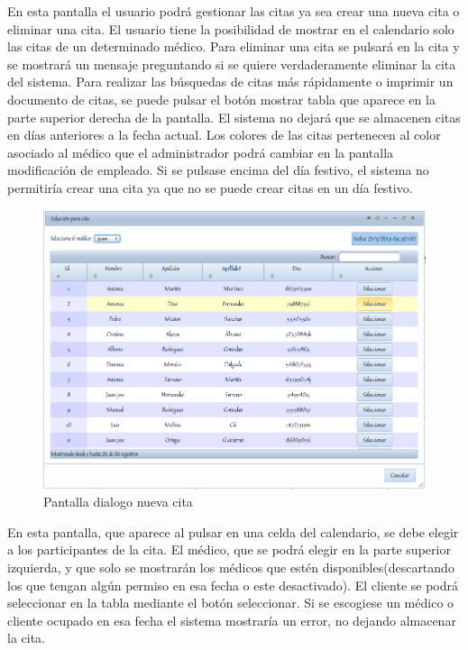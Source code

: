 \documentclass[a4paper,11pt]{book}
\begin{document}
En esta pantalla el usuario podrá gestionar las citas ya sea crear una nueva cita o eliminar una cita. El usuario tiene la posibilidad de mostrar en el calendario solo las citas de un determinado médico. Para eliminar una cita se pulsará en la cita y se mostrará un mensaje preguntando si se quiere verdaderamente eliminar la cita del sistema. Para realizar las búsquedas de citas más rápidamente o imprimir un documento de citas, se puede pulsar el botón mostrar tabla que aparece en la parte superior derecha de la pantalla. El sistema no dejará que se almacenen citas en días anteriores a la fecha actual. Los colores de las citas pertenecen al color asociado al médico que el administrador podrá cambiar en la pantalla modificación de empleado. Si se pulsase encima del día festivo, el sistema no permitiría crear una cita ya que no se puede crear citas en un día festivo.

\newpage
\begin{figure}[!htb]
  \centering
    \includegraphics[scale=0.35]{capcitas1.png}
  \caption{Pantalla dialogo nueva cita}
  \label{a}
\end{figure}

En esta pantalla, que aparece al pulsar en una celda del calendario, se debe elegir a los participantes de la cita. El médico, que se podrá elegir en la parte superior izquierda, y que solo se mostrarán los médicos que estén disponibles(descartando los que tengan algún permiso en esa fecha o este desactivado). El cliente se podrá seleccionar en la tabla mediante el botón seleccionar. Si se escogiese un médico o cliente ocupado en esa fecha el sistema mostraría un error, no dejando almacenar la cita.
\end{document}
